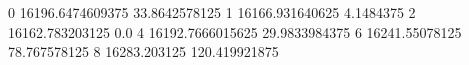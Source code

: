 0 16196.6474609375 33.8642578125
1 16166.931640625 4.1484375
2 16162.783203125 0.0
4 16192.7666015625 29.9833984375
6 16241.55078125 78.767578125
8 16283.203125 120.419921875
